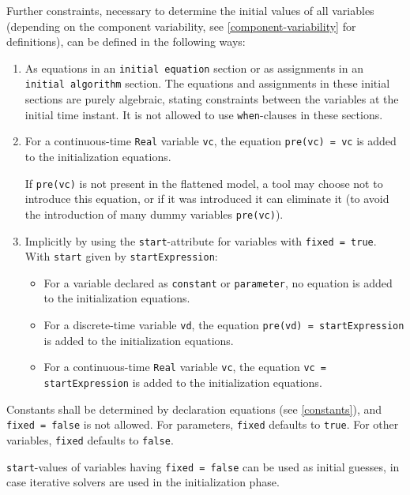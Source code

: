 Further constraints, necessary to determine the initial values of all variables (depending on the component variability, see \cref{component-variability} for definitions), can be defined in the following ways:
\begin{enumerate}
\item
  As equations in an \lstinline!initial equation! section or as assignments in an \lstinline!initial algorithm! section.
  The equations and assignments in these initial sections are purely algebraic, stating constraints between the variables at the initial time instant.
  It is not allowed to use \lstinline!when!-clauses in these sections.
\item
  For a continuous-time \lstinline!Real! variable \lstinline!vc!, the equation \lstinline!pre(vc) = vc! is added to the initialization equations.
  \begin{nonnormative}
  If \lstinline!pre(vc)! is not present in the flattened model, a tool may choose not to introduce this equation, or if it was introduced it can eliminate it (to avoid the introduction of many dummy variables \lstinline!pre(vc)!).
  \end{nonnormative}
\item
  Implicitly by using the \lstinline!start!-attribute for variables with \lstinline!fixed = true!.
  With \lstinline!start! given by \lstinline!startExpression!:
  \begin{itemize}
  \item
    For a variable declared as \lstinline!constant! or \lstinline!parameter!, no equation is added to the initialization equations.
  \item
    For a discrete-time variable \lstinline!vd!, the equation \lstinline!pre(vd) = startExpression! is added to the initialization equations.
  \item
    For a continuous-time \lstinline!Real! variable \lstinline!vc!, the equation \lstinline!vc = startExpression! is added to the initialization equations.
  \end{itemize}
\end{enumerate}

Constants shall be determined by declaration equations (see \cref{constants}), and \lstinline!fixed = false! is not allowed.
For parameters, \lstinline!fixed! defaults to \lstinline!true!.
For other variables, \lstinline!fixed! defaults to \lstinline!false!.

\lstinline!start!-values of variables having \lstinline!fixed = false! can be used as initial guesses, in case iterative solvers are used in the initialization phase.

